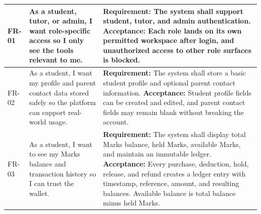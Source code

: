 \documentclass[11pt,a4paper]{article}
\begin{document}
\begin{longtable}{|L{1.5cm}|L{4.1cm}|L{9.0cm}|}
	FR-01           & As a student, tutor, or admin, I want role-specific access so I only see the tools relevant to me.                     & \textbf{Requirement:} The system shall support student, tutor, and admin authentication. \newline \textbf{Acceptance:} Each role lands on its own permitted workspace after login, and unauthorized access to other role surfaces is blocked.                                                                                                                                                                                                                                                                                                                                                                    \\
	\hline
	FR-02           & As a student, I want my profile and parent contact data stored safely so the platform can support real-world usage.    & \textbf{Requirement:} The system shall store a basic student profile and optional parent contact information. \newline \textbf{Acceptance:} Student profile fields can be created and edited, and parent contact fields may remain blank without breaking the account.                                                                                                                                                                                                                                                                                                                                           \\
	\hline
	FR-03           & As a student, I want to see my Marks balance and transaction history so I can trust the wallet.                        & \textbf{Requirement:} The system shall display total Marks balance, held Marks, available Marks, and maintain an immutable ledger. \newline \textbf{Acceptance:} Every purchase, deduction, hold, release, and refund creates a ledger entry with timestamp, reference, amount, and resulting balances. Available balance is total balance minus held Marks.                                                                                                                                                                                                                                                                                                                                               \\
	\hline

\end{longtable}
\end{document}
